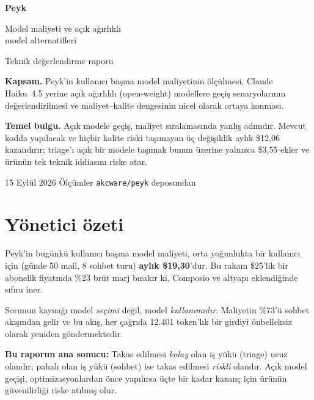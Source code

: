 \documentclass[11pt,a4paper]{article}
\newcommand{\code}[1]{\texttt{\small #1}}
\newenvironment{keybox}
  {\begin{center}\begin{lrbox}{\kbox}\begin{minipage}{0.90\textwidth}\color{ink}\small}
  {\end{minipage}\end{lrbox}\setlength{\fboxsep}{11pt}\colorbox{soft}{\usebox{\kbox}}\end{center}}
\begin{document}
\begin{titlepage}
\centering
\vspace*{3cm}
{\Huge\bfseries\color{ink} Peyk\par}
\vspace{0.6cm}
{\LARGE\color{ink} Model maliyeti ve açık ağırlıklı\\ model alternatifleri\par}
\vspace{0.8cm}
{\large\color{accent} Teknik değerlendirme raporu\par}
\vspace{2.2cm}
\begin{minipage}{0.8\textwidth}\small\color{ink}
\textbf{Kapsam.} Peyk'in kullanıcı başına model maliyetinin ölçülmesi, Claude Haiku~4.5
yerine açık ağırlıklı (open-weight) modellere geçiş senaryolarının değerlendirilmesi ve
maliyet--kalite dengesinin nicel olarak ortaya konması.
\vspace{0.5cm}

\textbf{Temel bulgu.} Açık modele geçiş, maliyet sıralamasında yanlış adımdır. Mevcut
kodda yapılacak ve hiçbir kalite riski taşımayan üç değişiklik aylık \$12{,}06 kazandırır;
triage'ı açık bir modele taşımak bunun üzerine yalnızca \$3{,}55 ekler ve ürünün tek
teknik iddiasını riske atar.
\end{minipage}
\vfill
{\small\color{ink} 15 Eylül 2026 \quad\textbullet\quad Ölçümler \code{akcware/peyk} deposundan\par}
\end{titlepage}

\tableofcontents
\newpage

\section{Yönetici özeti}

Peyk'in bugünkü kullanıcı başına model maliyeti, orta yoğunlukta bir kullanıcı için
(günde 50 mail, 8 sohbet turu) \textbf{aylık \$19{,}30}'dur. Bu rakam \$25'lik bir abonelik
fiyatında \%23 brüt marj bırakır ki, Composio ve altyapı eklendiğinde sıfıra iner.

Sorunun kaynağı model \emph{seçimi} değil, model \emph{kullanımıdır}. Maliyetin
\%73'ü sohbet akışından gelir ve bu akış, her çağrıda 12.401 token'lık bir girdiyi
önbelleksiz olarak yeniden göndermektedir.

\begin{keybox}
\textbf{Bu raporun ana sonucu:} Takas edilmesi \emph{kolay} olan iş yükü (triage) ucuz
olandır; pahalı olan iş yükü (sohbet) ise takas edilmesi \emph{riskli} olandır. Açık
model geçişi, optimizasyonlardan önce yapılırsa üçte bir kadar kazanç için ürünün
güvenilirliği riske atılmış olur.
\end{keybox}
\end{document}
